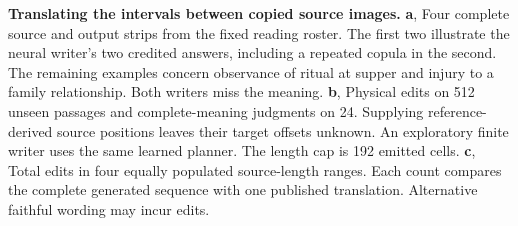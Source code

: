 \textbf{Translating the intervals between copied source images.}
\textbf{a}, Four complete source and output strips from the fixed reading roster. The first two illustrate the neural writer's two credited answers, including a repeated copula in the second. The remaining examples concern observance of ritual at supper and injury to a family relationship. Both writers miss the meaning. \textbf{b}, Physical edits on 512 unseen passages and complete-meaning judgments on 24. Supplying reference-derived source positions leaves their target offsets unknown. An exploratory finite writer uses the same learned planner. The length cap is 192 emitted cells. \textbf{c}, Total edits in four equally populated source-length ranges. Each count compares the complete generated sequence with one published translation. Alternative faithful wording may incur edits.
